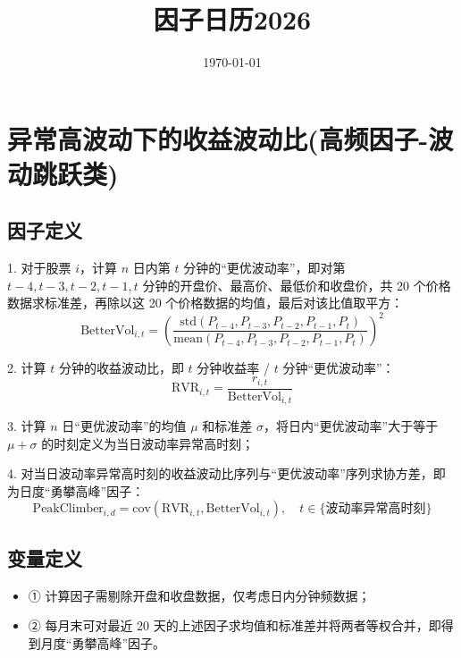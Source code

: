 \documentclass{article}
\title{因子日历2026}
\date{\today}
\begin{document}
\maketitle

\section{异常高波动下的收益波动比(高频因子-波动跳跃类)}

\subsection{因子定义}

1. 对于股票 \( i \)，计算 \( n \) 日内第 \( t \) 分钟的“更优波动率”，即对第 \( t-4, t-3, t-2, t-1, t \) 分钟的开盘价、最高价、最低价和收盘价，共 20 个价格数据求标准差，再除以这 20 个价格数据的均值，最后对该比值取平方：
\begin{equation}
    \mathrm{BetterVol}_{i,t} = \left( \frac{\mathrm{std}(P_{t-4}, P_{t-3}, P_{t-2}, P_{t-1}, P_t)}{\mathrm{mean}(P_{t-4}, P_{t-3}, P_{t-2}, P_{t-1}, P_t)} \right)^2
\end{equation}

2. 计算 \( t \) 分钟的收益波动比，即 \( t \) 分钟收益率 / \( t \) 分钟“更优波动率”：
\begin{equation}
    \mathrm{RVR}_{i,t} = \frac{r_{i,t}}{\mathrm{BetterVol}_{i,t}}
\end{equation}

3. 计算 \( n \) 日“更优波动率”的均值 \( \mu \) 和标准差 \( \sigma \)，将日内“更优波动率”大于等于 \( \mu + \sigma \) 的时刻定义为当日波动率异常高时刻；

4. 对当日波动率异常高时刻的收益波动比序列与“更优波动率”序列求协方差，即为日度“勇攀高峰”因子：
\begin{equation}
    \mathrm{PeakClimber}_{i,d} = \mathrm{cov}(\mathrm{RVR}_{i,t}, \mathrm{BetterVol}_{i,t}), \quad t \in \{ \text{波动率异常高时刻} \}
\end{equation}

\subsection{变量定义}
\begin{itemize}
    \item ① 计算因子需剔除开盘和收盘数据，仅考虑日内分钟频数据；
    \item ② 每月末可对最近 20 天的上述因子求均值和标准差并将两者等权合并，即得到月度“勇攀高峰”因子。
\end{itemize}
\end{document}
